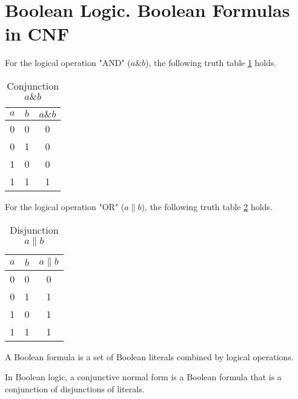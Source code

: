 \section{Boolean Logic. Boolean Formulas in CNF}

\begin{definition}
For the logical operation "AND" ($a \& b$), the following truth table \ref{tblAddAlgoAND} holds.
\begin{table}
\centering
\begin{tabular}{|c|c|c|}
\hline
$a$ & $b$ & $a \& b$ \\ \hline
0  & 0 & 0 \\
0  & 1 & 0 \\
1  & 0 & 0 \\
1  & 1 & 1 \\ \hline
\end{tabular}
\caption{Conjunction $a \& b$}
\label{tblAddAlgoAND}
\end{table}
\end{definition}

\begin{definition}
For the logical operation "OR" ($a \| b$), the following truth table \ref{tblAddAlgoOR} holds.
\begin{table}
\centering
\begin{tabular}{|c|c|c|}
\hline
$a$ & $b$ & $a \| b$ \\ \hline
0  & 0 & 0 \\
0  & 1 & 1 \\
1  & 0 & 1 \\
1  & 1 & 1 \\ \hline
\end{tabular}
\caption{Disjunction $a \| b$}
\label{tblAddAlgoOR}
\end{table}
\end{definition}

\begin{definition}
A Boolean formula is a set of Boolean literals combined by logical operations.
\end{definition}

\begin{definition}
In Boolean logic, a conjunctive normal form is a Boolean formula that is a conjunction of disjunctions of literals.
\end{definition}

